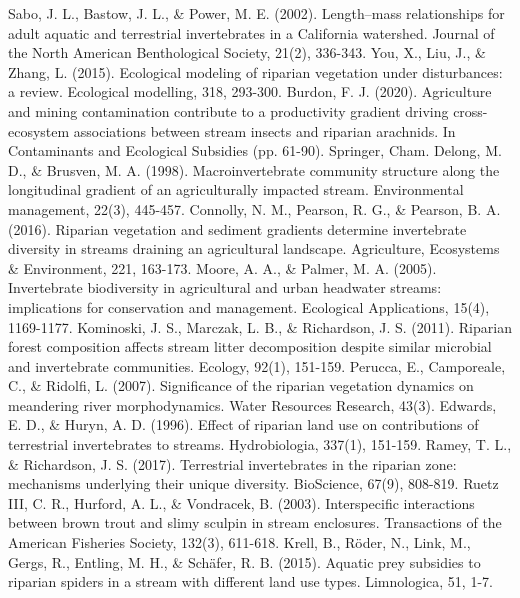 \documentclass[12pt,a4wide]{report}
\numberwithin{equation}{chapter}
\numberwithin{theorem}{chapter}
\begin{document}
\begin{thebibliography}{99}
  Sabo, J. L., Bastow, J. L., \& Power, M. E. (2002). Length–mass relationships for adult aquatic and terrestrial invertebrates in a California watershed. Journal of the North American Benthological Society, 21(2), 336-343.
  You, X., Liu, J., \& Zhang, L. (2015). Ecological modeling of riparian vegetation under disturbances: a review. Ecological modelling, 318, 293-300.
  Burdon, F. J. (2020). Agriculture and mining contamination contribute to a productivity gradient driving cross-ecosystem associations between stream insects and riparian arachnids. In Contaminants and Ecological Subsidies (pp. 61-90). Springer, Cham.
  Delong, M. D., \& Brusven, M. A. (1998). Macroinvertebrate community structure along the longitudinal gradient of an agriculturally impacted stream. Environmental management, 22(3), 445-457.
  Connolly, N. M., Pearson, R. G., \& Pearson, B. A. (2016). Riparian vegetation and sediment gradients determine invertebrate diversity in streams draining an agricultural landscape. Agriculture, Ecosystems \& Environment, 221, 163-173.
  Moore, A. A., \& Palmer, M. A. (2005). Invertebrate biodiversity in agricultural and urban headwater streams: implications for conservation and management. Ecological Applications, 15(4), 1169-1177.
  Kominoski, J. S., Marczak, L. B., \& Richardson, J. S. (2011). Riparian forest composition affects stream litter decomposition despite similar microbial and invertebrate communities. Ecology, 92(1), 151-159.
  Perucca, E., Camporeale, C., \& Ridolfi, L. (2007). Significance of the riparian vegetation dynamics on meandering river morphodynamics. Water Resources Research, 43(3).
  Edwards, E. D., \& Huryn, A. D. (1996). Effect of riparian land use on contributions of terrestrial invertebrates to streams. Hydrobiologia, 337(1), 151-159.
  Ramey, T. L., \& Richardson, J. S. (2017). Terrestrial invertebrates in the riparian zone: mechanisms underlying their unique diversity. BioScience, 67(9), 808-819.
  Ruetz III, C. R., Hurford, A. L., \& Vondracek, B. (2003). Interspecific interactions between brown trout and slimy sculpin in stream enclosures. Transactions of the American Fisheries Society, 132(3), 611-618.
  Krell, B., Röder, N., Link, M., Gergs, R., Entling, M. H., \& Schäfer, R. B. (2015). Aquatic prey subsidies to riparian spiders in a stream with different land use types. Limnologica, 51, 1-7.

\end{thebibliography}
\end{document}
